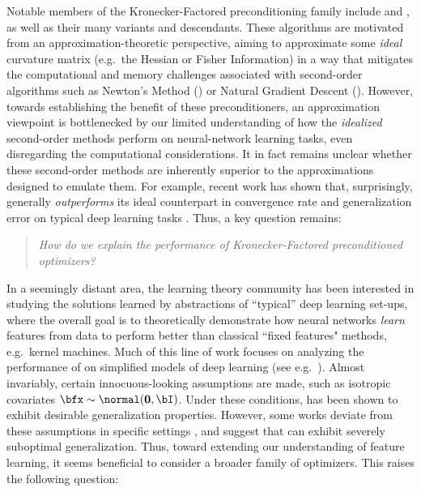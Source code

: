Notable members of the Kronecker-Factored preconditioning family include \Shampoo and \KFAC \citep{martens2015optimizing}, as well as their many variants and descendants. These algorithms are motivated from an approximation-theoretic perspective, aiming to approximate some \textit{ideal} curvature matrix (e.g.\ the Hessian or Fisher Information) in a way that mitigates the computational and memory challenges associated with second-order algorithms such as Newton's Method (\NM) or Natural Gradient Descent (\NGD). However, towards establishing the benefit of these preconditioners, an approximation viewpoint is bottlenecked by our limited understanding of how the \textit{idealized} second-order methods perform on neural-network learning tasks, even disregarding the computational considerations.
It in fact remains unclear whether these second-order methods are inherently superior to the approximations designed to emulate them. For example, recent work has shown that, surprisingly, \KFAC generally \emph{outperforms} its ideal counterpart \NGD in convergence rate and generalization error on typical deep learning tasks \citep{benzing2022gradient}. Thus, a key question remains:
\begin{quote}
\centering
\textit{How do we explain the performance of Kronecker-Factored preconditioned optimizers?}
\end{quote}
In a seemingly distant area, the learning theory community has been interested in studying the solutions learned by 
abstractions of ``typical'' deep learning set-ups, where the overall goal is to theoretically demonstrate how neural networks \textit{learn} features from data to perform better than classical ``fixed features" methods, e.g.\ kernel machines.
Much of this line of work focuses on analyzing the performance of \SGD on simplified models of deep learning (see e.g.\ \citet{collins2021exploiting, damian2022neural,ba2022high,barak2022hidden,abbe2023sgd,dandi2023learning,berthier2024learning,nichanitransformers, collins2024provable}). Almost invariably, certain innocuous-looking assumptions are made, such as isotropic covariates $\bfx \sim \normal(\mathbf{0}, \bI)$. Under these conditions, \SGD has been shown to exhibit desirable generalization properties. However, some works deviate from these assumptions in specific settings \cite{amari2020does, zhang2023meta}, and suggest that \SGD can exhibit severely suboptimal generalization. 
Thus, toward extending our understanding of feature learning, it seems beneficial to consider a broader family of optimizers. This raises the following question:
